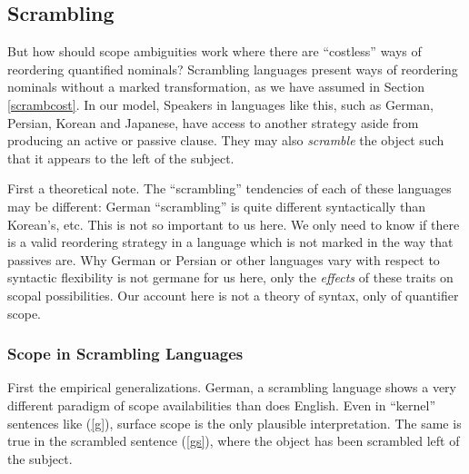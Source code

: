 \documentclass{article}
\begin{document}
\subsection{Scrambling\label{scramb}}

But how should scope ambiguities work where there are ``costless'' ways of reordering quantified nominals?
Scrambling languages present ways of reordering nominals without a marked transformation, as we have assumed in Section \ref{scrambcost}.
In our model, Speakers in languages like this, such as German, Persian, Korean and Japanese, have access to another strategy aside from producing an active or passive clause. They may also \emph{scramble} the object such that it appears to the left of the subject.

First a theoretical note.
The ``scrambling'' tendencies of each of these languages may be different: German ``scrambling'' is quite different syntactically than Korean's, etc.
This is not so important to us here.
We only need to know if there is a valid reordering strategy in a language which is not marked in the way that passives are.
Why German or Persian or other languages vary with respect to syntactic flexibility is not germane for us here, only the \emph{effects} of these traits on scopal possibilities.
Our account here is not a theory of syntax, only of quantifier scope.

\subsubsection{Scope in Scrambling Languages}

First the empirical generalizations.
German, a scrambling language shows a very different paradigm of scope availabilities than does English.
Even in ``kernel'' sentences like (\ref{g}), surface scope is the only plausible interpretation.
The same is true in the scrambled sentence (\ref{gs}), where the object has been scrambled left of the subject.

\begin{exe}
\end{exe}
\end{document}
